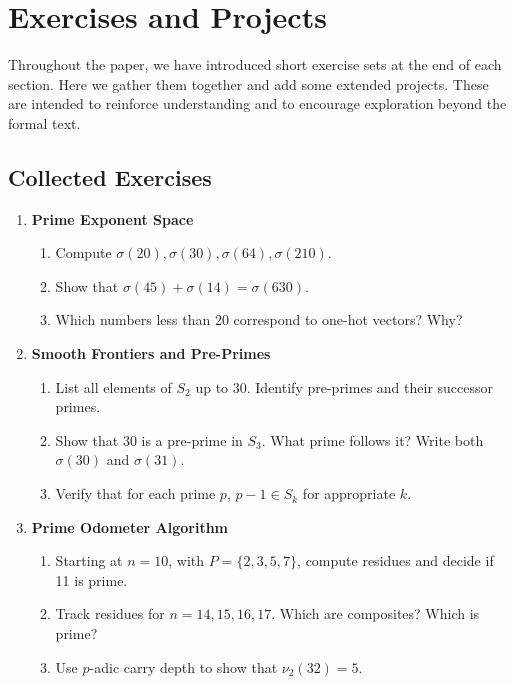 \documentclass[11pt]{article}
\theoremstyle{definition}
\begin{document}
\section{Exercises and Projects}

Throughout the paper, we have introduced short exercise sets at the end of each section.  
Here we gather them together and add some extended projects.  
These are intended to reinforce understanding and to encourage exploration 
beyond the formal text.

\subsection{Collected Exercises}

\begin{enumerate}[label=\textbf{Set \#\arabic*:}, leftmargin=*]

  \item \textbf{Prime Exponent Space}
  \begin{enumerate}
    \item Compute $\sigma(20), \sigma(30), \sigma(64), \sigma(210)$.  
    \item Show that $\sigma(45) + \sigma(14) = \sigma(630)$.  
    \item Which numbers less than 20 correspond to one-hot vectors? Why?
  \end{enumerate}

  \item \textbf{Smooth Frontiers and Pre-Primes}
  \begin{enumerate}
    \item List all elements of $S_2$ up to 30. Identify pre-primes and their successor primes.  
    \item Show that 30 is a pre-prime in $S_3$. What prime follows it? Write both $\sigma(30)$ and $\sigma(31)$.  
    \item Verify that for each prime $p$, $p-1 \in S_k$ for appropriate $k$.  
  \end{enumerate}

  \item \textbf{Prime Odometer Algorithm}
  \begin{enumerate}
    \item Starting at $n=10$, with $P=\{2,3,5,7\}$, compute residues and decide if 11 is prime.  
    \item Track residues for $n=14,15,16,17$. Which are composites? Which is prime?  
    \item Use $p$-adic carry depth to show that $\nu_2(32)=5$.  
  \end{enumerate}


\end{enumerate}
\end{document}
